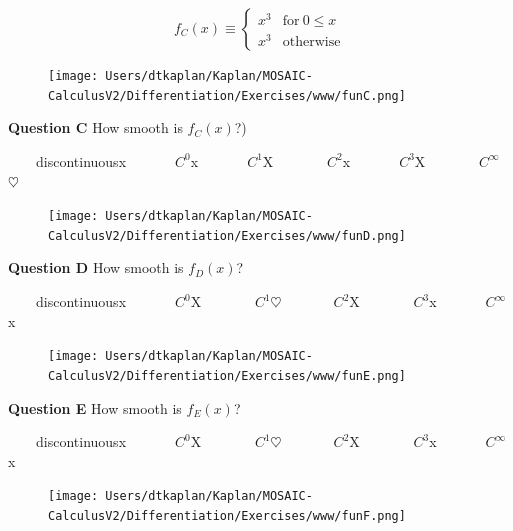 \documentclass[
  letterpaper,
  DIV=11,
  numbers=noendperiod,
  oneside]{article}
\begin{document}
\begin{multicols}{2}
\[f_C(x) \equiv \left\{\begin{array}{cl}{x^3} &  \text{for}\ 0 \leq x\\x^3& \text{otherwise}\end{array} \right.\]

\begin{figure}

{\centering \texttt{[image: Users/dtkaplan/Kaplan/MOSAIC-CalculusV2/Differentiation/Exercises/www/funC.png]}

}

\end{figure}

\textbf{Question C} How smooth is \(f_C(x)\)?)

~~~~{discontinuous{x}}~~~~~~~{\(C^0\){x}}~~~~~~~{\(C^1\){︎X
}}~~~~~~~{\(C^2\){x}}~~~~~~~{\(C^3\){︎X
}}~~~~~~~{\(C^\infty\){\(\heartsuit\ \)}}

\begin{figure}

{\centering \texttt{[image: Users/dtkaplan/Kaplan/MOSAIC-CalculusV2/Differentiation/Exercises/www/funD.png]}

}

\end{figure}

\textbf{Question D} How smooth is \(f_D(x)\)?

~~~~{discontinuous{x}}~~~~~~~{\(C^0\){︎X
}}~~~~~~~{\(C^1\){\(\heartsuit\ \)}}~~~~~~~{\(C^2\){︎X
}}~~~~~~~{\(C^3\){x}}~~~~~~~{\(C^\infty\){x}}

\begin{figure}

{\centering \texttt{[image: Users/dtkaplan/Kaplan/MOSAIC-CalculusV2/Differentiation/Exercises/www/funE.png]}

}

\end{figure}

\textbf{Question E} How smooth is \(f_E(x)\)?

~~~~{discontinuous{x}}~~~~~~~{\(C^0\){︎X
}}~~~~~~~{\(C^1\){\(\heartsuit\ \)}}~~~~~~~{\(C^2\){︎X
}}~~~~~~~{\(C^3\){x}}~~~~~~~{\(C^\infty\){x}}

\begin{figure}

{\centering \texttt{[image: Users/dtkaplan/Kaplan/MOSAIC-CalculusV2/Differentiation/Exercises/www/funF.png]}

}

\end{figure}


\end{multicols}
\end{document}
